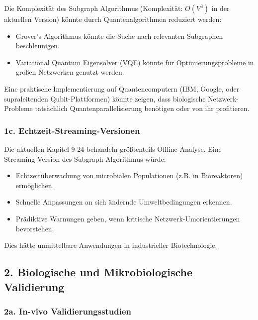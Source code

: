 \documentclass[a4paper,12pt]{article}
\theoremstyle{definition}
\begin{document}
Die Komplexität des Subgraph Algorithmus (Komplexität: $O(V^3)$ in der aktuellen Version) könnte durch Quantenalgorithmen reduziert werden:
\begin{itemize}
    \item Grover's Algorithmus könnte die Suche nach relevanten Subgraphen beschleunigen.
    \item Variational Quantum Eigensolver (VQE) könnte für Optimierungsprobleme in großen Netzwerken genutzt werden.
\end{itemize}

Eine praktische Implementierung auf Quantencomputern (IBM, Google, oder supraleitenden Qubit-Plattformen) könnte zeigen, dass biologische Netzwerk-Probleme tatsächlich Quantenparallelisierung benötigen oder von ihr profitieren.

\subsubsection{1c. Echtzeit-Streaming-Versionen}

Die aktuellen Kapitel 9-24 behandeln größtenteils Offline-Analyse. Eine Streaming-Version des Subgraph Algorithmus würde:
\begin{itemize}
    \item Echtzeitüberwachung von microbialen Populationen (z.B. in Bioreaktoren) ermöglichen.
    \item Schnelle Anpassungen an sich ändernde Umweltbedingungen erkennen.
    \item Prädiktive Warnungen geben, wenn kritische Netzwerk-Umorientierungen bevorstehen.
\end{itemize}

Dies hätte unmittelbare Anwendungen in industrieller Biotechnologie.

\subsection{2. Biologische und Mikrobiologische Validierung}

\subsubsection{2a. In-vivo Validierungsstudien}
\end{document}
